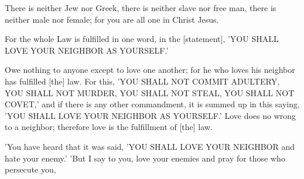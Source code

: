 \begin{scripture}[Galatians 3:28]
    There is neither Jew nor Greek, there is neither slave nor free man, there is neither male nor female; for you are all one in Christ Jesus.
\end{scripture}

\begin{scripture}[Galatians 5:14]
    For the whole Law is fulfilled in one word, in the [statement], 'YOU SHALL LOVE YOUR NEIGHBOR AS YOURSELF.'
\end{scripture}

\begin{scripture}[Romans 13:8-10]
    Owe nothing to anyone except to love one another; for he who loves his neighbor has fulfilled [the] law.
    For this, 'YOU SHALL NOT COMMIT ADULTERY, YOU SHALL NOT MURDER, YOU SHALL NOT STEAL, YOU SHALL NOT COVET,' and if there is any other commandment, it is summed up in this saying, 'YOU SHALL LOVE YOUR NEIGHBOR AS YOURSELF.'
    Love does no wrong to a neighbor; therefore love is the fulfillment of [the] law.
\end{scripture}

\begin{scripture}[Matthew 5:43-44]
    'You have heard that it was said, 'YOU SHALL LOVE YOUR NEIGHBOR and hate your enemy.'
    'But I say to you, love your enemies and pray for those who persecute you,
\end{scripture}

